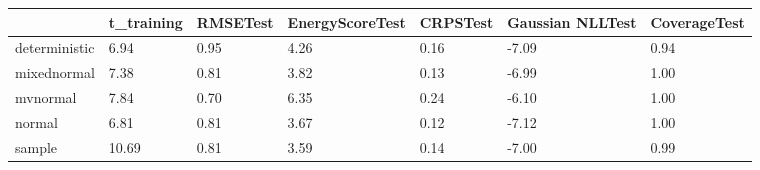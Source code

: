 \begin{tabular}{lllllll}
\toprule
 & t_training & RMSETest & EnergyScoreTest & CRPSTest & Gaussian NLLTest & CoverageTest \\
\midrule
deterministic & 6.94 & 0.95 & 4.26 & 0.16 & -7.09 & 0.94 \\
mixednormal & 7.38 & 0.81 & 3.82 & 0.13 & -6.99 & 1.00 \\
mvnormal & 7.84 & 0.70 & 6.35 & 0.24 & -6.10 & 1.00 \\
normal & 6.81 & 0.81 & 3.67 & 0.12 & -7.12 & 1.00 \\
sample & 10.69 & 0.81 & 3.59 & 0.14 & -7.00 & 0.99 \\
\bottomrule
\end{tabular}
